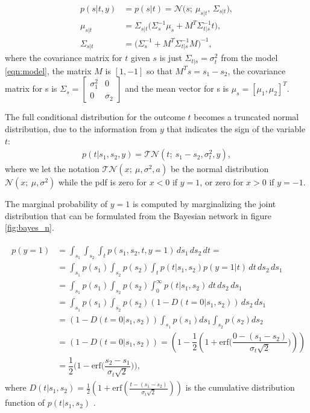 \documentclass{article}
\begin{document}
	\begin{subequations}
	\begin{align}
		p(s | t, y) &= p(s | t) = \mathcal{N}\Big( s;~\mu_{s|t},\,\Sigma_{s|t} \Big),\\
		\mu_{s|t} &= \Sigma_{s|t}\Big(\Sigma_s^{-1} \mu_s + M^T\Sigma_{t|s}^{-1}t\Big),\\
		\Sigma_{s|t} &= \Big( \Sigma_s^{-1} + M^T\Sigma_{t|s}^{-1}M \Big)^{-1},
	\end{align}
	\end{subequations}
	where the covariance matrix for $t$ given $s$ is just $\Sigma_{t|s}=\sigma_t^2$ from the model \eqref{eqn:model}, the matrix $M$ is $[1, -1]$ so that $M^Ts = s_1 - s_2$, the covariance matrix for s is $\Sigma_s = \begin{bmatrix}
	\sigma_1^2 & 0\\ 0 & \sigma_2 \end{bmatrix}$ and the mean vector for s is $\mu_s = [\mu_1, \mu_2]^T$.
	
	The full conditional distribution for the outcome $t$ becomes a truncated normal distribution, due to the information from $y$ that indicates the sign of the variable $t$:
	\begin{align}
	p(t|s_1, s_2, y) = \mathcal{TN}(t;~s_1-s_2, \sigma_t^2, y),
	\end{align}
	where we let the notation $\mathcal{TN}(x;~\mu, \sigma^2, a)$ be the normal distribution $\mathcal{N}(x;~\mu, \sigma^2)$ while the pdf is zero for $ x<0 $ if $ y=1 $, or zero for $ x>0 $ if $ y=-1 $.
	
	The marginal probability of $ y=1 $ is computed by marginalizing the joint distribution that can be formulated from the Bayesian network in figure \ref{fig:bayes_n}.
	
	\begin{align}
	\begin{split}
	p(y=1) 	&= \int_{s_1}\int_{s_2}\int_t p(s_1, s_2, t, y=1)\,ds_1\,ds_2\,dt=\\
			&= \int_{s_1}p(s_1)\int_{s_2}p(s_2)\int_t p(t|s_1,s_2)p(y=1|t)\,dt\,ds_2\,ds_1\\
			&= \int_{s_1}p(s_1)\int_{s_2}p(s_2)\int_0^\infty p(t|s_1,s_2)\,dt\,ds_2\,ds_1\\
			&= \int_{s_1}p(s_1)\int_{s_2}p(s_2) (1 - D(t=0|s_1,s_2))\,ds_2\,ds_1\\
			&= (1-D(t=0|s_1,s_2))\int_{s_1}p(s_1)ds_1\int_{s_2}p(s_2)ds_2\\
			&= (1-D(t=0|s_1,s_2)) = (1 - \dfrac{1}{2}(1+\text{erf}\Big(\dfrac{0-(s_1-s_2)}{\sigma_t\sqrt{2}}\Big)))\\
			&= \dfrac{1}{2}\Big(1 - \text{erf}\Big(\dfrac{s_2-s_1}{\sigma_t\sqrt{2}}\Big)\Big),
	\end{split}
	\end{align}
	where $ D(t|s_1,s_2) = \frac{1}{2}(1+\text{erf}(\frac{t-(s_1-s_2)}{\sigma_t\sqrt{2}}))$ is the cumulative distribution function of $p(t|s_1,s_2)$ \cite{MATHWORLDWOLFRAM.COM}.
	
\end{document}
